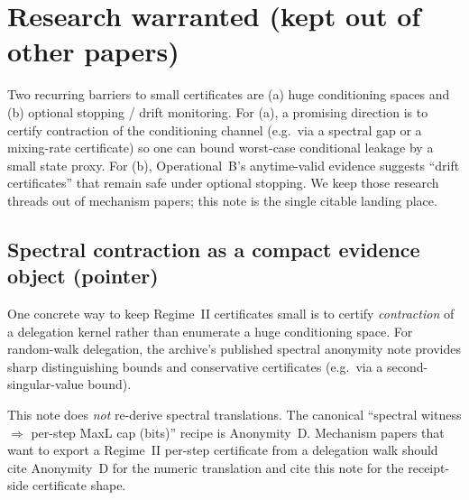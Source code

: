 \documentclass[11pt]{article}
\begin{document}
\section{Research warranted (kept out of other papers)}
Two recurring barriers to small certificates are (a) huge conditioning spaces and (b) optional stopping / drift monitoring.
For (a), a promising direction is to certify contraction of the conditioning channel (e.g.\ via a spectral gap or a mixing-rate certificate)
so one can bound worst-case conditional leakage by a small state proxy.\cite{series:spectral}
For (b), Operational~B's anytime-valid evidence suggests ``drift certificates'' that remain safe under optional stopping.\cite{series:operationalB}
We keep those research threads out of mechanism papers; this note is the single citable landing place.

\subsection{Spectral contraction as a compact evidence object (pointer)}
\label{sec:spectral-cert}

One concrete way to keep Regime~II certificates small is to certify \emph{contraction} of a delegation kernel rather than enumerate a huge conditioning space.
For random-walk delegation, the archive's published spectral anonymity note provides sharp distinguishing bounds and conservative certificates (e.g.\ via a second-singular-value bound).\cite{series:spectral}

This note does \emph{not} re-derive spectral translations.
The canonical ``spectral witness $\Rightarrow$ per-step MaxL cap (bits)'' recipe is Anonymity~D.\cite{series:spectral2budget}
Mechanism papers that want to export a Regime~II per-step certificate from a delegation walk should cite Anonymity~D for the numeric translation and cite this note for the receipt-side certificate shape.
\end{document}
